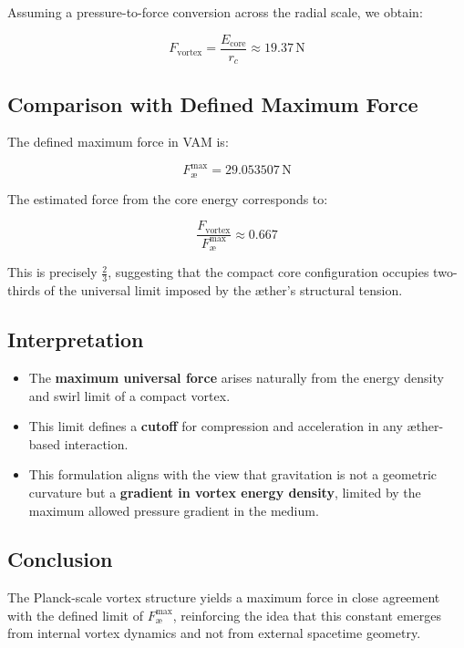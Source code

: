 Assuming a pressure-to-force conversion across the radial scale, we obtain:

\begin{equation}
F_{\text{vortex}} = \frac{E_{\text{core}}}{r_c} \approx 19.37 \, \text{N}
\end{equation}

\subsection{Comparison with Defined Maximum Force}

The defined maximum force in VAM is:

\[
F_\text{\ae}^\text{max} = 29.053507 \, \text{N}
\]

The estimated force from the core energy corresponds to:

\[
\frac{F_{\text{vortex}}}{F_\text{\ae}^\text{max}} \approx 0.667
\]

This is precisely \(\frac{2}{3}\), suggesting that the compact core configuration occupies two-thirds of the universal limit imposed by the æther's structural tension.

\subsection{Interpretation}

\begin{itemize}
    \item The \textbf{maximum universal force} arises naturally from the energy density and swirl limit of a compact vortex.
    \item This limit defines a \textbf{cutoff} for compression and acceleration in any æther-based interaction.
    \item This formulation aligns with the view that gravitation is not a geometric curvature but a \textbf{gradient in vortex energy density}, limited by the maximum allowed pressure gradient in the medium.
\end{itemize}

\subsection{Conclusion}

The Planck-scale vortex structure yields a maximum force in close agreement with the defined limit of \( F_\text{\ae}^\text{max} \), reinforcing the idea that this constant emerges from internal vortex dynamics and not from external spacetime geometry.
